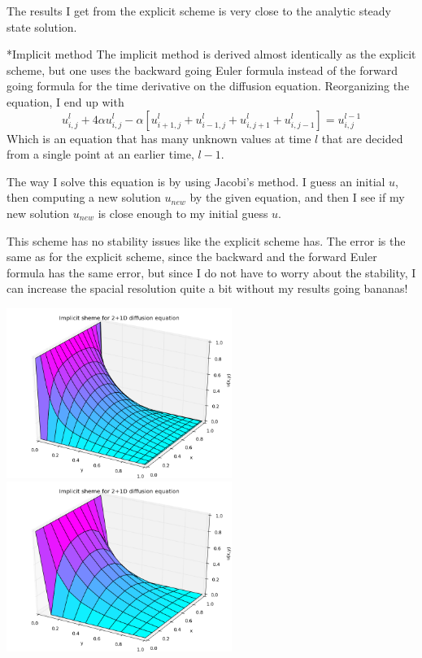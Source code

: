 \documentclass[a4paper, 12pt, titlepage]{article}
\newcommand{\beq}{\begin{equation*}}
\newcommand{\eeq}{\end{equation*}}
\begin{document}
\begin{section}
\begin{subsection}
    The results I get from the explicit scheme is very close to the analytic steady state solution. 
    
 \end{subsection}
  \begin{subsection}*{Implicit method}
   The implicit method is derived almost identically as the explicit scheme, but one uses the backward going
   Euler formula instead of the forward going formula for the time derivative on the diffusion equation.
   Reorganizing the equation, I end up with
   \beq u_{i,j}^l + 4\alpha u_{i,j}^l - \alpha[u_{i+1,j}^l + u_{i-1,j}^l + u_{i,j+1}^l + u_{i,j-1}^l] = u_{i,j}^{l-1} \eeq
   Which is an equation that has many unknown values at time $l$ that are decided from a single point at
   an earlier time, $l-1$. 
   
   The way I solve this equation is by using Jacobi's method. I guess an initial $u$, then computing a new 
   solution $u_{new}$ by the given equation, and then I see if my new solution $u_{new}$ is close enough to 
   my initial guess $u$. 
   
   This scheme has no stability issues like the explicit scheme has. The error is the same as for the 
   explicit scheme, since the backward and the forward Euler formula has the same error, but since I do
   not have to worry about the stability, I can increase the spacial resolution quite a bit without my 
   results going bananas! 
   
    \includegraphics[width=0.55\textwidth]{build-main-Desktop-Debug/Implicit100_100.png}
    \includegraphics[width=0.55\textwidth]{build-main-Desktop-Debug/Implicit10_1000.png}
    

\end{subsection}
\end{section}
\end{document}
